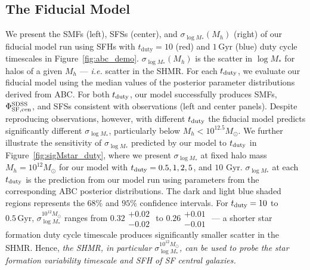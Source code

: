 \documentclass[12pt, letterpaper, preprint, tighten]{aastex62}
\newcommand{\edt}[1]{{\color{dred}{\bf} #1}}
\newcommand{\tduty}{t_{\rm duty}}
\newcommand{\siglogm}{\sigma_{\log M_*}}
\begin{document}
\subsection{\edt{The Fiducial Model}} \label{sec:sfdutycycle}
We present the SMFs (left), SFSs (center), and 
\edt{$\siglogm(M_h)$ (right) of our fiducial model run using SFHs with 
$t_\mathrm{duty} = 10$ (red) and $1\,\mathrm{Gyr}$ (blue) duty cycle timescales 
in Figure~\ref{fig:abc_demo}. $\siglogm(M_h)$ is the scatter in $\log M_*$ for 
halos of a given $M_h$ --- \emph{i.e.} scatter in the SHMR.} For each $\tduty$,
we evaluate our fiducial model using the median values of the posterior parameter 
distributions derived from ABC. For both $\tduty$, our model successfully produces 
SMFs, $\Phi^{\rm SDSS}_{\rm SF,cen}$, and SFSs consistent with observations (left 
and center panels). Despite reproducing observations, however, with different 
$t_{\rm duty}$ the fiducial model predicts significantly different $\siglogm$, 
particularly below $M_h < 10^{12.5}M_\odot$. We further illustrate the sensitivity 
of $\siglogm$ predicted by our model to $\tduty$ in Figure~\ref{fig:sigMstar_duty}, 
where we present $\siglogm$ at fixed halo mass $M_h = 10^{12} M_\odot$ for our 
model with $t_{\rm duty} = 0.5, 1, 2, 5$, and $10$ Gyr. $\siglogm$ at each $t_{\rm duty}$
is the prediction from our model run using parameters from the corresponding ABC 
posterior distributions. The dark and light blue shaded regions represents the 
$68\%$ and $95\%$ confidence intervals. For $t_{\rm duty} = 10$ to $0.5\,\mathrm{Gyr}$,
$\siglogm^{10^{12} M_\odot}$ ranges from $0.32\substack{+0.02\\ -0.02}$ to $0.26\substack{+0.01\\-0.01}$
--- a shorter star formation duty cycle timescale produces significantly
smaller scatter in the SHMR. 
\edt{Hence, \emph{the SHMR, in particular $\siglogm^{10^{12} M_\odot}$, can be 
used to probe the star formation variability timescale and SFH of SF central galaxies.}}
\end{document}
